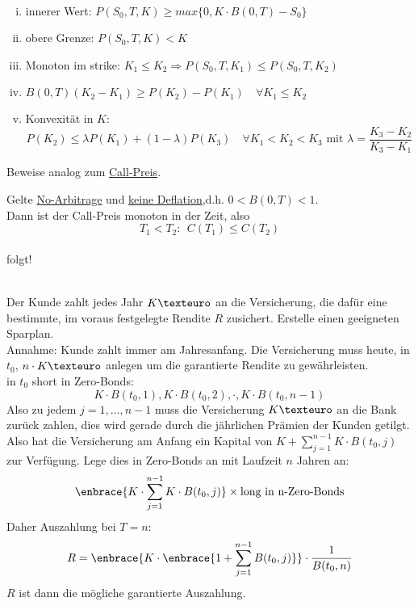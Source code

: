 \\
\begin{enumerate}[(i)]
	\item innerer Wert: $P(S_0,T,K)\ge max\{0,K\cdot B(0,T)-S_0\}$
	\item obere Grenze: $P(S_0,T,K)<K$
	\item Monoton im strike: $K_1\le K_2\Rightarrow P(S_0,T,K_1)\le P(S_0,T,K_2)$
	\item $B(0,T)(K_2-K_1)\ge P(K_2)-P(K_1)\quad \forall K_1\le K_2$
	\item Konvexität in $K$: 
	\[ P(K_2)\le \lambda P(K_1)+(1-\lambda)P(K_3)\quad \forall K_1<K_2<K_3\text{ mit } \lambda=\frac{K_3-K_2}{K_3-K_1} \]
\end{enumerate}
Beweise analog zum \hyperref[sub:call-preis]{Call-Preis}.

Gelte \uline{No-Arbitrage} und \uline{keine Deflation},d.h. $0<B(0,T)<1$.\\
Dann ist der Call-Preis monoton in der Zeit, also \[ T_1<T_2:~~C(T_1)\le C(T_2) \]
\\
folgt!

\\
Der Kunde zahlt jedes Jahr $K \texteuro$ an die Versicherung, die dafür eine bestimmte, im voraus festgelegte Rendite $R$ zusichert. Erstelle einen geeigneten Sparplan.\\
Annahme: Kunde zahlt immer am Jahresanfang. Die Versicherung muss heute, in $t_0$, $n\cdot K \texteuro$ anlegen um die garantierte Rendite zu gewährleisten.\\
in $t_0$ short in Zero-Bonds: \[ K\cdot B(t_0,1), K\cdot B(t_0,2), \cdot, K\cdot B(t_0,n-1) \]
Also zu jedem $j=1,\dots,n-1$ muss die Versicherung $K\texteuro$ an die Bank zurück zahlen, dies wird gerade durch die jährlichen Prämien der Kunden getilgt.\\
Also hat die Versicherung am Anfang ein Kapital von $K+\sum_{j=1}^{n-1}K\cdot B(t_0,j)$ zur Verfügung. Lege dies in Zero-Bonds an mit Laufzeit $n$ Jahren an: \[ \enbrace{K\cdot \sum_{j=1}^{n-1}K\cdot B(t_0,j)}\times \text{long in n-Zero-Bonds} \]
Daher Auszahlung bei $T=n$: \[ R=\enbrace{K\cdot \enbrace{1+\sum_{j=1}^{n-1}B(t_0,j)}}\cdot \frac{1}{B(t_0,n)} \]
$R$ ist dann die mögliche garantierte Auszahlung.